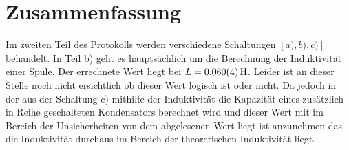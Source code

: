 
\section{Zusammenfassung}
Im zweiten Teil des Protokolls werden verschiedene Schaltungen  $\left[ a),b),c) \right]$ behandelt.
In Teil b) geht es hauptsächlich um die Berechnung der Induktivität einer Spule.
Der errechnete Wert liegt bei $L= \SI{0,060+-0,004}{H}$. Leider ist an dieser Stelle noch nicht ersichtlich ob dieser Wert 
logisch ist oder nicht.
Da jedoch in der aus der Schaltung c) mithilfe der Induktivität die Kapazität eines zusätzlich in Reihe geschalteten Kondensators berechnet wird und dieser Wert mit im Bereich der Unsicherheiten von dem abgelesenen Wert liegt ist anzunehmen das die Induktivität durchaus im Bereich der theoretischen Induktivität liegt.
\cite{lw}


